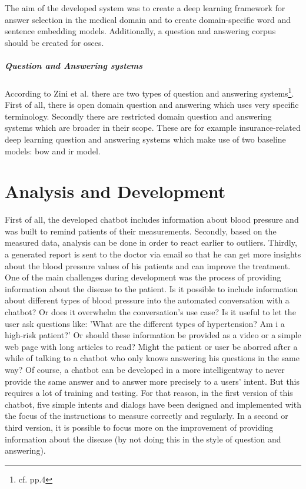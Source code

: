 The aim of the developed system was to create a deep learning framework for answer selection in the medical domain and to create domain-specific word and sentence embedding models. Additionally, a question and answering corpus should be created for \ac{osce}s.

\paragraph{Question and Answering systems}
According to Zini et al. there are two types of question and answering systems\footnote{cf.\autocite{zini} pp.4}. First of all, there is open domain question and answering which uses very specific terminology. Secondly there are restricted domain question and answering systems which are broader in their scope. These are for example insurance-related deep learning question and answering systems which make use of two baseline models: \ac{bow} and \ac{ir} model. 

\chapter{Analysis and Development}

First of all, the developed chatbot includes information about blood pressure and was built to remind patients of their measurements. Secondly, based on the measured data, analysis can be done in order to react earlier to outliers. Thirdly, a generated report is sent to the doctor via email so that he can get more insights about the blood pressure values of his patients and can improve the treatment.
One of the main challenges during development was the process of providing information about the disease to the patient. Is it possible to include information about different types of blood pressure into the automated conversation with a chatbot? Or does it overwhelm the conversation's use case? Is it useful to let the user ask questions like: 'What are the different types of hypertension? Am i a high-risk patient?' 
Or should these information be provided as a video or a simple web page with long articles to read? Might the patient or user be aborred after a while of talking to a chatbot who only knows answering his questions in the same way?
Of course, a chatbot can be developed in a more intelligentway to never provide the same answer and to answer more precisely to a users' intent. But this requires a lot of training and testing. 
For that reason, in the first version of this chatbot, five simple intents and dialogs have been designed and implemented with the focus of the instructions to measure correctly and regularly. 
In a second or third version, it is possible to focus more on the improvement of providing information about the disease (by not doing this in the style of question and answering).


